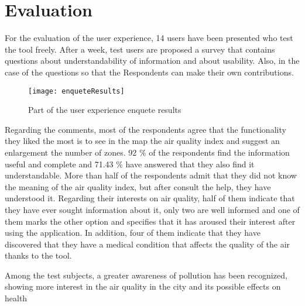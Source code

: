 \newpage
\section{Evaluation}
For the evaluation of the user experience, 14 users have been presented who test the tool freely.
After a week, test users are proposed a survey that contains questions about understandability
of information and about usability. Also, in the case of the questions so that the
Respondents can make their own contributions.
\begin{figure}[ht]
   \centering
   \texttt{[image: enqueteResults]}
   \caption{Part of the user experience enquete results}
\end{figure}

Regarding the comments, most of the respondents agree that the functionality they liked the most is to see in the
map the air quality index and suggest an enlargement the number of zones.
92 \% of the respondents find the information useful and complete and 71.43 \% have answered that they also find it
understandable.
More than half of the respondents admit that they did not know the meaning of the air quality index, but after
consult the help, they have understood it.
Regarding their interests on air quality, half of them indicate that they have ever sought information about it,
only two are well informed and one of them marks the other option and specifies that it has aroused their interest after using
the application.
In addition, four of them indicate that they have discovered that they have a medical condition that affects the quality of the air thanks
to the tool.

Among the test subjects, a greater awareness of pollution has been recognized, showing more interest in the
air quality in the city and its possible effects on health
